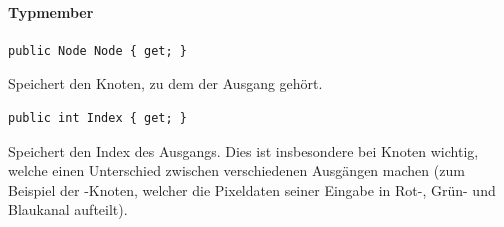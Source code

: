 \paragraph{Typmember}
\begin{itemize}

	\begin{verbatim}
public Node Node { get; }
	\end{verbatim}
Speichert den Knoten, zu dem der Ausgang gehört.

	\begin{verbatim}
public int Index { get; }
	\end{verbatim}
Speichert den Index des Ausgangs. Dies ist insbesondere bei Knoten wichtig, welche einen Unterschied zwischen verschiedenen Ausgängen machen (zum Beispiel der -Knoten, welcher die Pixeldaten seiner Eingabe in Rot-, Grün- und Blaukanal aufteilt).

\end{itemize}
